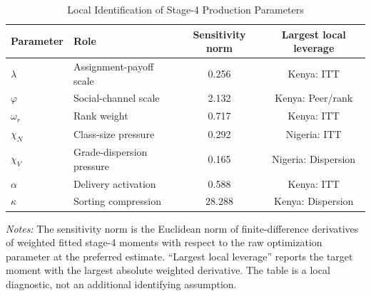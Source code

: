 \begin{table}[H]
\centering
\caption{Local Identification of Stage-4 Production Parameters}
\label{tab:struct_local_identification}
\begin{threeparttable}
\begin{tabular}[t]{llcc}
\toprule
Parameter & Role & Sensitivity norm & Largest local leverage \\
\midrule
$\lambda$ & Assignment-payoff scale & 0.256 & Kenya: ITT \\
$\varphi$ & Social-channel scale & 2.132 & Kenya: Peer/rank \\
$\omega_r$ & Rank weight & 0.717 & Kenya: ITT \\
$\chi_N$ & Class-size pressure & 0.292 & Nigeria: ITT \\
$\chi_V$ & Grade-dispersion pressure & 0.165 & Nigeria: Dispersion \\
$\alpha$ & Delivery activation & 0.588 & Kenya: ITT \\
$\kappa$ & Sorting compression & 28.288 & Kenya: Dispersion \\
\bottomrule
\end{tabular}
\begin{tablenotes}
\footnotesize
\item \textit{Notes:} The sensitivity norm is the Euclidean norm of finite-difference derivatives of weighted fitted stage-4 moments with respect to the raw optimization parameter at the preferred estimate. ``Largest local leverage'' reports the target moment with the largest absolute weighted derivative. The table is a local diagnostic, not an additional identifying assumption.
\end{tablenotes}
\end{threeparttable}
\end{table}
